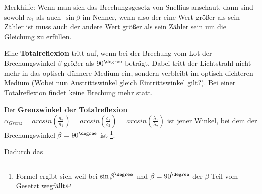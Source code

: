\documentclass[../document.tex]{subfiles}
\begin{document}
Merkhilfe: Wenn man sich das Brechungsgesetz von Snellius anschaut, dann sind sowohl $n_1$ als auch $\sin \beta$ im Nenner, wenn also der eine Wert größer als sein Zähler ist muss auch der andere Wert größer als sein Zähler sein um die Gleichung zu erfüllen.

Eine \textbf{Totalreflexion} tritt auf, wenn bei der Brechung vom Lot der Brechungswinkel $\beta$ größer als $90^\degree$ beträgt. Dabei tritt der Lichtstrahl nicht mehr in das optisch dünnere Medium ein, sondern verbleibt im optisch dichteren Medium (Wobei nun Austrittswinkel gleich Eintrittswinkel gilt?). Bei einer Totalreflexion findet keine Brechung mehr statt.

Der \textbf{Grenzwinkel der Totalreflexion } $\alpha_{Grenz} = arcsin(\frac{n_2}{n_1}) = arcsin(\frac{c_1}{c_2}) = arcsin(\frac{\lambda_1}{\lambda_2})$ ist jener Winkel, bei dem der Brechungswinkel $\beta = 90^\degree$ ist \footnote{Formel ergibt sich weil bei $\sin\beta^\degree$ und $\beta = 90^\degree$ der $\beta$ Teil vom Gesetzt wegfällt}. 

Dadurch das 
\end{document}
